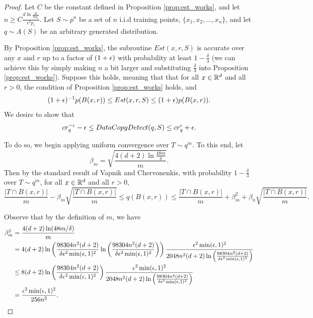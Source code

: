 \begin{proof}

Let $C$ be the constant defined in Proposition \ref{prop:est_works}, and let $n \geq C \frac{d \ln \frac{d}{\delta \epsilon p_\epsilon}}{\epsilon^2p_\epsilon}.$ Let $S \sim p^n$ be a set of $n$ i.i.d training points, $\{x_1, x_2, \dots, x_n\}$, and let $q \sim A(S)$ be an arbitrary generated distribution. 

By Proposition \ref{prop:est_works}, the subroutine $Est(x, r, S)$ is accurate over any $x$ and $r$ up to a factor of $(1 + \epsilon)$ with probability at least $1-\frac{\delta}{3}$ (we can achieve this by simply making $n$ a bit larger and substituting $\frac{\delta}{3}$ into Proposition \ref{prop:est_works}). Suppose this holds, meaning that that for all $x \in \mathbb{R}^d$ and all $r > 0$, the condition of Proposition \ref{prop:est_works} holds, and 
\begin{equation}\label{eqn:est_is_accurate}
(1+\epsilon)^{-1}p(B(x,r)) \leq Est(x,r, S) \leq (1+\epsilon)p(B(x, r)).
\end{equation} 
We desire to show that $$cr_q^{-\epsilon}  - \epsilon \leq DataCopyDetect(q, S) \leq cr_q^{\epsilon} + \epsilon.$$ 

To do so, we begin applying uniform convergence over $T \sim q^m$. To this end, let $$\beta_m = \sqrt{\frac{4(d+2)\ln \frac{48m}{\delta}}{m}}.$$ Then by the standard result of Vapnik and Chervonenkis, with probability $1-\frac{\delta}{3}$ over $T \sim q^m$, for all $x \in \mathbb{R}^d$ and all $r > 0$, 
\begin{equation}\label{qeqn:VC}
\frac{|T \cap B(x,r)|}{m} - \beta_m\sqrt{\frac{|T \cap B(x,r)|}{m}} \leq q(B(x,r)) \leq \frac{|T \cap B(x,r)|}{m} + \beta_m^2 + \beta_n\sqrt{\frac{|T \cap B(x,r)|}{m}}.
\end{equation}

Observe that by the definition of $m$, we have 
\begin{equation}\label{qeqn:bound_beta_n}
\begin{split}
\beta_m^2 &= \frac{4(d+2)\ln(48m/\delta)}{m} \\
&= 4(d+2) \ln \left(\frac{98304n^2(d+2)}{\delta\epsilon^2\min(\epsilon, 1)^2}\ln \left(\frac{98304n^2(d+2)}{\delta \epsilon^2\min(\epsilon, 1)^2}\right)\right) \frac{\epsilon^2\min(\epsilon, 1)^2}{2048n^2(d+2)\ln \left(\frac{98304n^2(d+2)}{\delta \epsilon^2\min(\epsilon, 1)^2} \right)}  \\
&\leq 8(d+2)\ln \left(\frac{98304n^2(d+2)}{\delta \epsilon^2\min(\epsilon, 1)^2}\right) \frac{\epsilon^2\min(\epsilon, 1)^2}{2048n^2(d+2)\ln \left(\frac{98304n^2(d+2)}{\delta \epsilon^2\min(\epsilon, 1)^2} \right)} \\
&= \frac{\epsilon^2\min(\epsilon, 1)^2}{256n^2}.
\end{split}
\end{equation}


\end{proof}
